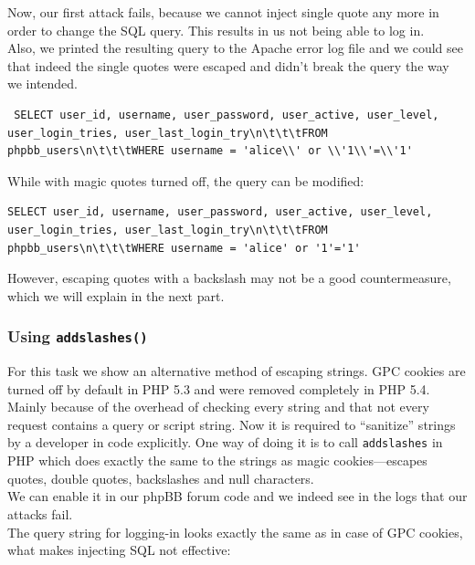 \documentclass[12pt, a4paper, pdflatex]{article}
\begin{document}
Now, our first attack fails, because we cannot inject single quote any more in order to change the SQL query. This results in us not being able to log in.\\
Also, we printed the resulting query to the Apache error log file and we could see that indeed the single quotes were escaped and didn't break the query the way we intended.\\
\lstset{
	captionpos=b,
	frame=single,
	language=SQL,
	breaklines=true,
	label=sql1
}
\begin{lstlisting}
 SELECT user_id, username, user_password, user_active, user_level, user_login_tries, user_last_login_try\n\t\t\tFROM phpbb_users\n\t\t\tWHERE username = 'alice\\' or \\'1\\'=\\'1'
\end{lstlisting}
While with magic quotes turned off, the query can be modified:
\lstset{
	captionpos=b,
	frame=single,
	language=SQL,
	breaklines=true,
	label=sql2
}
\begin{lstlisting}
SELECT user_id, username, user_password, user_active, user_level, user_login_tries, user_last_login_try\n\t\t\tFROM phpbb_users\n\t\t\tWHERE username = 'alice' or '1'='1'
\end{lstlisting}
However, escaping quotes with a backslash may not be a good countermeasure, which we will explain in the next part.

\subsubsection{Using \texttt{addslashes()}}

For this task we show an alternative method of escaping strings. GPC cookies are turned off by default in PHP 5.3 and were removed completely in PHP 5.4. Mainly because of the overhead of checking every string and that not every request contains a query or script string. Now it is required to ``sanitize'' strings by a developer in code explicitly. One way of doing it is to call \texttt{addslashes} in PHP which does exactly the same to the strings as magic cookies---escapes quotes, double quotes, backslashes and null characters.\\

We can enable it in our phpBB forum code and we indeed see in the logs that our attacks fail.\\
The query string for logging-in looks exactly the same as in case of GPC cookies, what makes injecting SQL not effective:
\end{document}
